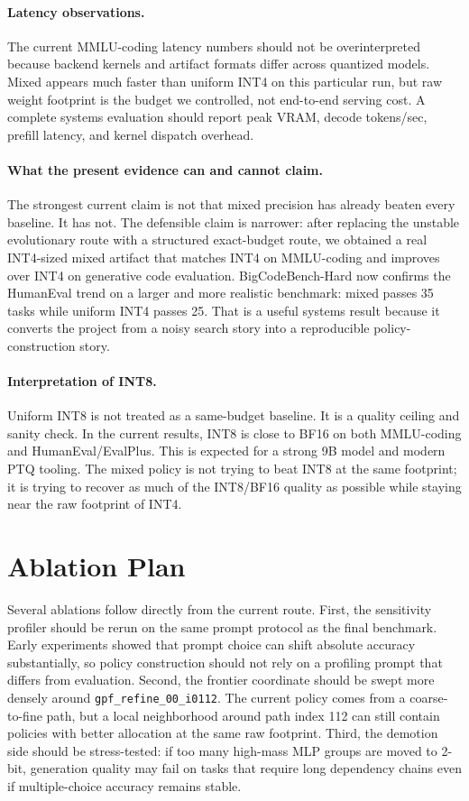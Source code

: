\documentclass{article}
\newcommand{\policyid}{\texttt{gpf\_refine\_00\_i0112}}
\begin{document}
\paragraph{Latency observations.}
The current MMLU-coding latency numbers should not be overinterpreted because backend kernels and artifact formats differ across quantized models. Mixed appears much faster than uniform INT4 on this particular run, but raw weight footprint is the budget we controlled, not end-to-end serving cost. A complete systems evaluation should report peak VRAM, decode tokens/sec, prefill latency, and kernel dispatch overhead.

\paragraph{What the present evidence can and cannot claim.}
The strongest current claim is not that mixed precision has already beaten every baseline. It has not. The defensible claim is narrower: after replacing the unstable evolutionary route with a structured exact-budget route, we obtained a real INT4-sized mixed artifact that matches INT4 on MMLU-coding and improves over INT4 on generative code evaluation. BigCodeBench-Hard now confirms the HumanEval trend on a larger and more realistic benchmark: mixed passes 35 tasks while uniform INT4 passes 25. That is a useful systems result because it converts the project from a noisy search story into a reproducible policy-construction story.

\paragraph{Interpretation of INT8.}
Uniform INT8 is not treated as a same-budget baseline. It is a quality ceiling and sanity check. In the current results, INT8 is close to BF16 on both MMLU-coding and HumanEval/EvalPlus. This is expected for a strong 9B model and modern PTQ tooling. The mixed policy is not trying to beat INT8 at the same footprint; it is trying to recover as much of the INT8/BF16 quality as possible while staying near the raw footprint of INT4.

\section{Ablation Plan}

Several ablations follow directly from the current route. First, the sensitivity profiler should be rerun on the same prompt protocol as the final benchmark. Early experiments showed that prompt choice can shift absolute accuracy substantially, so policy construction should not rely on a profiling prompt that differs from evaluation. Second, the frontier coordinate should be swept more densely around \policyid{}. The current policy comes from a coarse-to-fine path, but a local neighborhood around path index 112 can still contain policies with better allocation at the same raw footprint. Third, the demotion side should be stress-tested: if too many high-mass MLP groups are moved to 2-bit, generation quality may fail on tasks that require long dependency chains even if multiple-choice accuracy remains stable.
\end{document}
